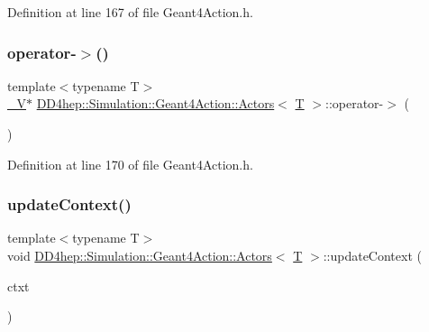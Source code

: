 Definition at line 167 of file Geant4\+Action.\+h.

\hypertarget{class_d_d4hep_1_1_simulation_1_1_geant4_action_1_1_actors_a74da9b8e362394518116e48f8f0d6c63}{}\label{class_d_d4hep_1_1_simulation_1_1_geant4_action_1_1_actors_a74da9b8e362394518116e48f8f0d6c63} 
\subsubsection{\texorpdfstring{operator-\/$>$()}{operator->()}\hspace{0.1cm}{\footnotesize\ttfamily [2/2]}}
{\footnotesize\ttfamily template$<$typename T$>$ \\
\hyperlink{class_d_d4hep_1_1_simulation_1_1_geant4_action_1_1_actors_a18b6dfb1542a2cd036d8317db48f6c16}{\+\_\+V}$\ast$ \hyperlink{class_d_d4hep_1_1_simulation_1_1_geant4_action_1_1_actors}{D\+D4hep\+::\+Simulation\+::\+Geant4\+Action\+::\+Actors}$<$ \hyperlink{class_t}{T} $>$\+::operator-\/$>$ (\begin{DoxyParamCaption}{ }\end{DoxyParamCaption})\hspace{0.3cm}{\ttfamily [inline]}}



Definition at line 170 of file Geant4\+Action.\+h.

\hypertarget{class_d_d4hep_1_1_simulation_1_1_geant4_action_1_1_actors_aadb2c770ac471bc278d2fc9a1cc719d3}{}\label{class_d_d4hep_1_1_simulation_1_1_geant4_action_1_1_actors_aadb2c770ac471bc278d2fc9a1cc719d3} 
\subsubsection{\texorpdfstring{update\+Context()}{updateContext()}}
{\footnotesize\ttfamily template$<$typename T$>$ \\
void \hyperlink{class_d_d4hep_1_1_simulation_1_1_geant4_action_1_1_actors}{D\+D4hep\+::\+Simulation\+::\+Geant4\+Action\+::\+Actors}$<$ \hyperlink{class_t}{T} $>$\+::update\+Context (\begin{DoxyParamCaption}\item[{\hyperlink{class_d_d4hep_1_1_simulation_1_1_geant4_context}{Geant4\+Context} $\ast$}]{ctxt }\end{DoxyParamCaption})\hspace{0.3cm}{\ttfamily [inline]}}



